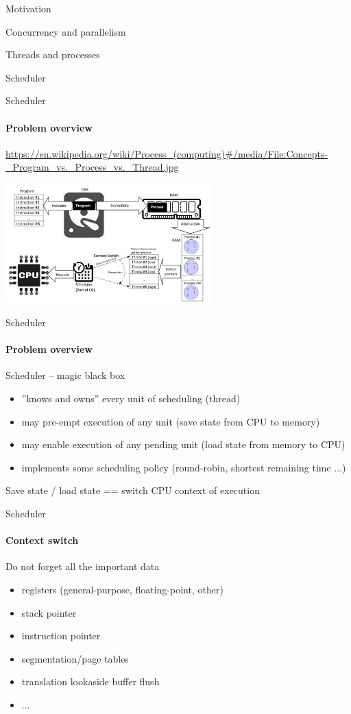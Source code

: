 \begin{section}{Motivation}
\begin{section}{Concurrency and parallelism}
\begin{section}{Threads and processes}
\begin{section}{Scheduler}
\showTOC

\begin{frame}{Scheduler}
\framesubtitle{Problem overview}

{\tiny\url{https://en.wikipedia.org/wiki/Process_(computing)#/media/File:Concepts-_Program_vs._Process_vs._Thread.jpg}}

\begin{center}
\includegraphics[width=0.6\textwidth]{./pics/full_process_pic.png}
\end{center}


\end{frame}

\begin{frame}[noframenumbering]{Scheduler}
\framesubtitle{Problem overview}

Scheduler -- magic black box
\begin{itemize}
    \item ''knows and owns'' every unit of scheduling (thread)
    \item may pre-empt execution of any unit (save state from CPU to memory) 
    \item may enable execution of any pending unit (load state from memory to CPU)
    \item implements some scheduling policy (round-robin, shortest remaining time ...)
\end{itemize}

\pause

Save state / load state == switch CPU context of execution

\end{frame}


\begin{frame}{Scheduler}
\framesubtitle{Context switch}

Do not forget all the important data
\begin{itemize}
    \item registers (general-purpose, floating-point, other)
    \item stack pointer
    \item instruction pointer
    \item segmentation/page tables
    \item translation lookaside buffer flush
    \item ...
\end{itemize}


\end{frame}
\end{section}
\end{section}
\end{section}
\end{section}
